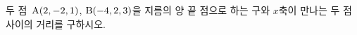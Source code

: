 두 점~$\mathrm{A}(2{,}\mkern3mu\mathopen{}-2{,}\mkern3mu\mathopen{}1)$, $\mathrm{B}(-4{,}\mkern3mu\mathopen{}2{,}\mkern3mu\mathopen{}3)$을 지름의 양 끝 점으로 하는 구와 $x$축이 만나는 두 점 사이의 거리를 구하시오.
